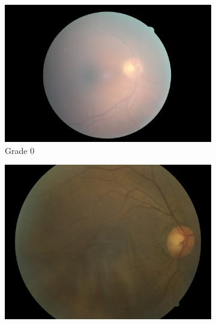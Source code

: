 \begin{figure}[htbp]
    \bigskip
     \begin{subfigure}[b]{0.19\textwidth}
         \centering
         \includegraphics[width=\textwidth, height=\textwidth]{figures/chapter4/Dataset/noDR/75_right.jpeg}
         \caption{Grade 0}
    \end{subfigure}
    \hfill
    \begin{subfigure}[b]{0.19\textwidth}
        \centering
        \includegraphics[width=\textwidth, height=\textwidth]{figures/chapter4/Dataset/mild/36_right.jpeg}

\end{subfigure}
\end{figure}
